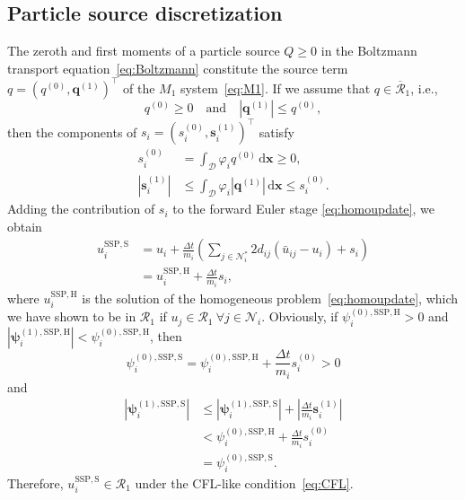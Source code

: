 \documentclass[preprint, 11pt]{elsarticle}
\newcommand{\diff}{\mathrm{d} }
\newcommand{\N}{\mathcal{N}}
\newcommand{\x}{\mathbf{x}}
\newcommand{\s}{\mathbf{s}}
\newcommand{\D}{\mathcal{D}}
\begin{document}
\subsection{Particle source discretization}

The zeroth and first moments of a particle source $Q\geq 0$ in the Boltzmann transport equation~\eqref{eq:Boltzmann} constitute the source term $q= (q^{(0)},\mathbf{q}^{(1)})^\top$ of the $M_1$ system~\eqref{eq:M1}.
If we assume that $q\in\overline{\mathcal{R}}_1$, i.e.,
\begin{equation*}
    q^{(0)}\geq 0\quad  \text{and}\quad \left| \mathbf{q}^{(1)}\right|\leq q^{(0)},
\end{equation*}
then the components of $s_i = (s_i^{(0)},\s_i^{(1)})^\top$ satisfy
\begin{equation*}
\begin{split}
    s_i^{(0)} &=  \int_\D \varphi_iq^{(0)} \,\diff\x \geq 0,\\
    \left|\s_i^{(1)}\right| &\leq \int_\D \varphi_i\left|\mathbf{q}^{(1)}\right|\,\diff\x \leq s_i^{(0)}.
\end{split}
\end{equation*}
Adding the contribution of $s_i$ to the forward Euler stage
\eqref{eq:homoupdate}, we obtain
\begin{equation}\label{eq:LOparticlesource}
\begin{split}
    u_i^{\mathrm{SSP,S}} &= u_i + \frac{\Delta t}{m_i}  \left(\sum_{j \in\N_i^*} 2d_{ij} (\bar u_{ij} -u_i) + s_i\right) \\
    &= u_i^{\mathrm{SSP,H}} +\frac{\Delta t}{m_i} s_i,
\end{split}
\end{equation}
where $u_i^{\mathrm{SSP,H}}$ is the solution of the homogeneous problem~\eqref{eq:homoupdate}, which we have shown to be in $\mathcal{R}_1$ if $u_j\in\mathcal{R}_1\ \forall j\in\N_i$.
Obviously, if $\psi_i^{(0),\mathrm{SSP,H}}>0$ and $\left|\bm\psi_i^{(1),\mathrm{SSP,H}}\right| < \psi_i^{(0),\mathrm{SSP,H}}$, then
\begin{equation*}
   \psi_i^{(0),\mathrm{SSP,S}} = \psi_i^{(0),\mathrm{SSP,H}} +\frac{\Delta t}{m_i} s_i^{(0)} >0
\end{equation*}
and 
\begin{align*}
     \left|\bm\psi_i^{(1),\mathrm{SSP,S}} \right| &\leq  \left|\bm\psi_i^{(1),\mathrm{SSP,S}}\right| + \left|\frac{\Delta t}{m_i} \s_i^{(1)}\right|\\
     &<   \psi_i^{(0),\mathrm{SSP,H}} + \frac{\Delta t}{m_i} s_i^{(0)}  \\
     & = \psi_i^{(0),\mathrm{SSP,S}}.
\end{align*}
Therefore, $u_i^{\mathrm{SSP,S}}\in \mathcal{R}_1$ under the CFL-like condition~\eqref{eq:CFL}.
\end{document}
